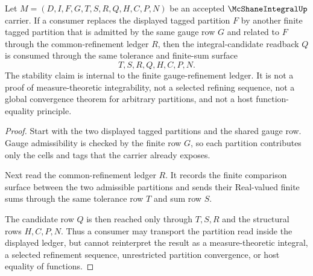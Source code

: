 \begin{theorem}
\label{thm:mcshane-integral-gauge-refinement-stability}
Let $M=(D,I,F,G,T,S,R,Q,H,C,P,N)$ be an accepted $\McShaneIntegralUp$ carrier. If a consumer replaces the displayed tagged partition $F$ by another finite tagged partition that is admitted by the same gauge row $G$ and related to $F$ through the common-refinement ledger $R$, then the integral-candidate readback $Q$ is consumed through the same tolerance and finite-sum surface
$$
T,S,R,Q,H,C,P,N.
$$
The stability claim is internal to the finite gauge-refinement ledger. It is not a proof of measure-theoretic integrability, not a selected refining sequence, not a global convergence theorem for arbitrary partitions, and not a host function-equality principle.
\end{theorem}
\begin{proof}
Start with the two displayed tagged partitions and the shared gauge row. Gauge admissibility is checked by the finite row $G$, so each partition contributes only the cells and tags that the carrier already exposes.

Next read the common-refinement ledger $R$. It records the finite comparison surface between the two admissible partitions and sends their Real-valued finite sums through the same tolerance row $T$ and sum row $S$.

The candidate row $Q$ is then reached only through $T,S,R$ and the structural rows $H,C,P,N$. Thus a consumer may transport the partition read inside the displayed ledger, but cannot reinterpret the result as a measure-theoretic integral, a selected refinement sequence, unrestricted partition convergence, or host equality of functions.
\end{proof}



